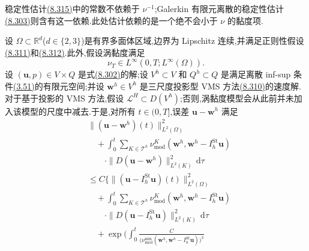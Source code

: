 \begin{note}[关于稳定性估计]
\label{note:vms-coarse-projection-stability-comment}
稳定性估计\hyperref[eq:vms-coarse-projection-stability-estimate]{(8.315)}中的常数不依赖于 $\nu^{-1}$;Galerkin 有限元离散的稳定性估计\hyperref[eq:vms-coarse-projection-continuous-stability]{(8.303)}则含有这一依赖.此处估计依赖的是一个绝不会小于 $\nu$ 的黏度项.
\end{note}

\begin{theorem}[修正黏度依赖的速度误差估计]
\label{thm:vms-coarse-projection-error-estimate}\label{thm:three-level-projection-vms-velocity-error}
设 $\Omega\subset\mathbb R^d$($d\in\{2,3\}$)是有界多面体区域,边界为 Lipschitz 连续,并满足正则性假设\hyperref[eq:vms-coarse-projection-data-assumptions]{(8.311)}和\hyperref[eq:vms-coarse-projection-solution-regularity]{(8.312)}.此外,假设涡黏度满足
\begin{equation}\label{eq:vms-coarse-projection-turbulent-viscosity-regularity}
 \nu_T\in L^\infty(0,T;L^\infty(\Omega)).
\end{equation}
设 $(\bm u,p)\in V\times Q$ 是式\hyperref[eq:vms-coarse-projection-continuous-equation]{(8.302)}的解;设 $V^h\subset V$ 和 $Q^h\subset Q$ 是满足离散 inf-sup 条件\hyperref[eq:discrete-infsup-condition]{(3.51)}的有限元空间;并设 $\bm w^h\in V^h$ 是三尺度投影型 VMS 方法\hyperref[eq:vms-coarse-projection-divergence-free-method]{(8.310)}的速度解.对于基于投影的 VMS 方法,假设
$\mathcal L^H\subset D(V^h)$;否则,涡黏度模型会从此前并未加入该模型的尺度中减去.于是,对所有 $t\in(0,T]$,误差 $\bm u-\bm w^h$ 满足
\begin{equation}\label{eq:vms-coarse-projection-error-estimate}
\begin{aligned}
 &\| (\bm u-\bm w^h)(t)\|_{L^2(\Omega)}^2\\
 &\quad+\int_0^t\sum_{K\in\mathcal T^h}
   \nu_{\mathrm{mod}}^K(\bm w^h,\bm w^h-I_h^{\mathrm{St}}\bm u)\\
 &\qquad\cdot\|D(\bm u-\bm w^h)\|_{L^2(K)}^2\,\mathrm d\tau\\
 &\le C\Biggl\{
   \| (\bm u-I_h^{\mathrm{St}}\bm u)(t)\|_{L^2(\Omega)}^2\\
 &\quad+\int_0^t\sum_{K\in\mathcal T^h}
   \nu_{\mathrm{mod}}^K(\bm w^h,\bm w^h-I_h^{\mathrm{St}}\bm u)\\
 &\qquad\cdot\|D(\bm u-I_h^{\mathrm{St}}\bm u)\|_{L^2(K)}^2\,\mathrm d\tau\\
 &\quad+\exp\Biggl(\int_0^t
   \frac{C}{\bigl(\nu_{\mathrm{mod}}^{\min}(\bm w^h,
      \bm w^h-I_h^{\mathrm{St}}\bm u)\bigr)^3}

\end{aligned}
\end{equation}
\end{theorem}
